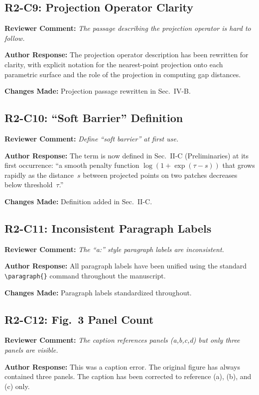 \documentclass[11pt]{article}
\newcommand{\RC}[1]{\noindent\textcolor{revcolor}{\textbf{Reviewer Comment:} \emph{#1}}\par\medskip}
\newcommand{\AR}[1]{\noindent\textcolor{respcolor}{\textbf{Author Response:} #1}\par\medskip}
\newcommand{\CH}[1]{\noindent\textbf{Changes Made:} #1\par\bigskip}
\begin{document}
\subsection*{R2-C9: Projection Operator Clarity}

\RC{The passage describing the projection operator is hard to follow.}

\AR{The projection operator description has been rewritten for
clarity, with explicit notation for the nearest-point projection
onto each parametric surface and the role of the projection in
computing gap distances.}

\CH{Projection passage rewritten in Sec.~IV-B.}

\subsection*{R2-C10: ``Soft Barrier'' Definition}

\RC{Define ``soft barrier'' at first use.}

\AR{The term is now defined in Sec.~II-C (Preliminaries) at its
first occurrence: ``a smooth penalty function
$\log(1+\exp(\tau-s))$ that grows rapidly as the distance~$s$
between projected points on two patches decreases below
threshold~$\tau$.''}

\CH{Definition added in Sec.~II-C.}

\subsection*{R2-C11: Inconsistent Paragraph Labels}

\RC{The ``a:'' style paragraph labels are inconsistent.}

\AR{All paragraph labels have been unified using the standard
\texttt{\textbackslash paragraph\{\}} command throughout the
manuscript.}

\CH{Paragraph labels standardized throughout.}

\subsection*{R2-C12: Fig.~3 Panel Count}

\RC{The caption references panels (a,b,c,d) but only three
panels are visible.}

\AR{This was a caption error. The original figure has always
contained three panels. The caption has been corrected to
reference (a), (b), and (c) only.}
\end{document}
